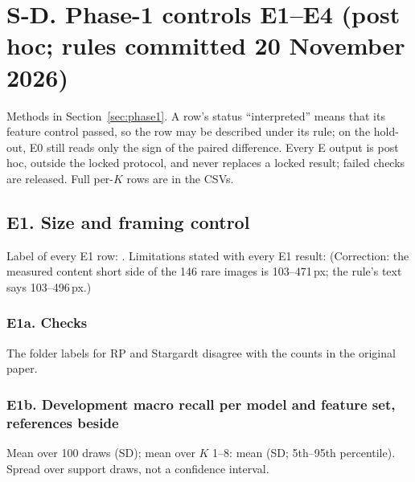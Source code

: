 \section*{S-D. Phase-1 controls E1--E4 (post hoc; rules committed 20 November 2026)}
Methods in Section~\ref{sec:phase1}. A row's status ``interpreted'' means that its feature control passed, so the row may be described under its rule; on the hold-out, E0 still reads only the sign of the paired difference. Every E output is post hoc, outside the locked protocol, and never replaces a locked result; failed checks are released. Full per-$K$ rows are in the CSVs.
\ifgen\else
{}
\fi

\ifgen
\subsection*{E1. Size and framing control}
Label of every E1 row: . Limitations stated with every E1 result:  (Correction: the measured content short side of the 146 rare images is 103--471\,px; the rule's text says 103--496\,px.)
\fi
{}\ifgen
\subsubsection*{E1a. Checks}
{\scriptsize\setlength{\tabcolsep}{3pt}}
 \fnRS The folder labels for RP and Stargardt disagree with the counts in the original paper.
\fi
{}\ifgen
\subsubsection*{E1b. Development macro recall per model and feature set, references beside}
Mean over 100 draws (SD); mean over $K$ 1--8: mean (SD; 5th--95th percentile). Spread over support draws, not a confidence interval.
{\scriptsize\setlength{\tabcolsep}{3pt}}
\fi
{}\ifgen
